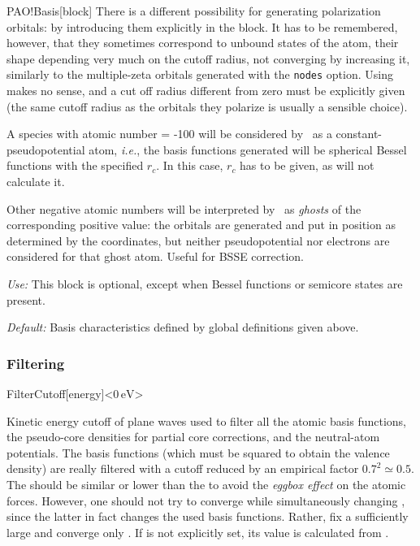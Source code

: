 \begin{fdfentry}{PAO!Basis}[block]
There is a different possibility for generating polarization orbitals:
by introducing them explicitly in the  block.
It has to be remembered, however, that they sometimes correspond to
unbound states of the atom, their shape depending very much on the
cutoff radius, not converging by increasing it, similarly to the
multiple-zeta orbitals generated with the \texttt{nodes} option.
Using  makes no sense, and a cut off
radius different from zero must be explicitly given (the same cutoff radius
as the orbitals they polarize is usually a sensible choice).

A species with atomic number = -100 will be considered by \siesta\ as
a constant-pseudopotential atom, \textit{i.e.}, the basis functions
generated will be spherical Bessel functions
with the specified $r_c$. In this case, $r_c$ has to be given, as
 will not calculate it.

Other negative atomic numbers will be interpreted by \siesta\ as
\textit{ghosts}
of the corresponding positive value: the orbitals
are generated and put in position as determined by the coordinates,
but neither pseudopotential nor electrons are considered for that
ghost atom. Useful for BSSE correction.

\textit{Use:} This block is optional, except when Bessel functions or
semicore states are present.

\textit{Default:} Basis characteristics defined by global definitions given
above.

\end{fdfentry}

\subsubsection{Filtering}
\label{sec:filtering}

\begin{fdfentry}{FilterCutoff}[energy]<$0\,\mathrm{eV}$>

  Kinetic energy cutoff of plane waves used to filter all the atomic
  basis functions, the pseudo-core densities for partial core
  corrections, and the neutral-atom potentials.  The basis functions
  (which must be squared to obtain the valence density) are really
  filtered with a cutoff reduced by an empirical factor
  $0.7^2 \simeq 0.5$. The  should be similar or
  lower than the  to avoid the \emph{eggbox
      effect} on the atomic forces.  However, one should not try to
  converge  while simultaneously changing
  , since the latter in fact changes the used
  basis functions. Rather, fix a sufficiently large
   and converge only .  If
   is not explicitly set, its value is calculated
  from .

\end{fdfentry}


